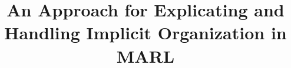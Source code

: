 \documentclass[runningheads]{llncs}
\begin{document}
\title{An Approach for Explicating and Handling Implicit Organization in MARL}
%
%

\author{}
\authorrunning{}
\institute{}


\maketitle              %

\end{document}
